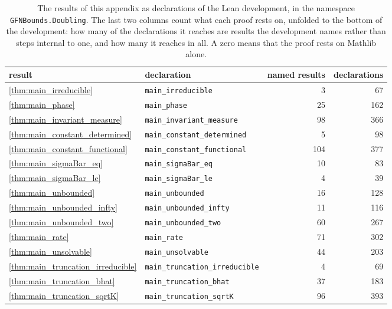 \begin{table}[htb]
\centering
\small
\begin{tabular}{@{}l l r r@{}}
\hline
result & declaration & named results & declarations \\
\hline
\ref{thm:main_irreducible} & \texttt{\small main\_irreducible} & 3 & 67 \\
\ref{thm:main_phase} & \texttt{\small main\_phase} & 25 & 162 \\
\ref{thm:main_invariant_measure} & \texttt{\small main\_invariant\_measure} & 98 & 366 \\
\ref{thm:main_constant_determined} & \texttt{\small main\_constant\_determined} & 5 & 98 \\
\ref{thm:main_constant_functional} & \texttt{\small main\_constant\_functional} & 104 & 377 \\
\ref{thm:main_sigmaBar_eq} & \texttt{\small main\_sigmaBar\_eq} & 10 & 83 \\
\ref{thm:main_sigmaBar_le} & \texttt{\small main\_sigmaBar\_le} & 4 & 39 \\
\ref{thm:main_unbounded} & \texttt{\small main\_unbounded} & 16 & 128 \\
\ref{thm:main_unbounded_infty} & \texttt{\small main\_unbounded\_infty} & 11 & 116 \\
\ref{thm:main_unbounded_two} & \texttt{\small main\_unbounded\_two} & 60 & 267 \\
\ref{thm:main_rate} & \texttt{\small main\_rate} & 71 & 302 \\
\ref{thm:main_unsolvable} & \texttt{\small main\_unsolvable} & 44 & 203 \\
\ref{thm:main_truncation_irreducible} & \texttt{\small main\_truncation\_irreducible} & 4 & 69 \\
\ref{thm:main_truncation_bhat} & \texttt{\small main\_truncation\_bhat} & 37 & 183 \\
\ref{thm:main_truncation_sqrtK} & \texttt{\small main\_truncation\_sqrtK} & 96 & 393 \\
\hline
\end{tabular}
\caption{The results of this appendix as declarations of the Lean development, in the
namespace \texttt{GFNBounds.Doubling}. The last two columns count what each proof rests on,
unfolded to the bottom of the development: how many of the declarations it reaches are results the
development names rather than steps internal to one, and how many it reaches in all. A zero means
that the proof rests on Mathlib alone.}
\label{tab:doubling_decls}
\end{table}

